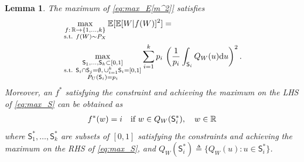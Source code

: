 \documentclass[conference]{IEEEtran}
\newtheorem{lemma}{Lemma}
\newcommand{\R}{\mathbb{R}}
\newcommand{\E}{\mathbb{E}}
\def\sS{{\mathsf S}}
\def\rd{{\rm d}}
\def\deq{\triangleq}
\begin{document}
\begin{lemma}\label{lm:convert_f_S}
The maximum of \eqref{eq:max_E[m^2]} satisfies
\begin{align}
& \max_{\substack{f:\,\R \rightarrow \{1,\ldots,k\} 
\\ 
\textnormal{s.t. } f(W)\sim P_X}} \E[\E[W|f(W)]^2] = 
\nonumber \\
& 
\max_{\substack{\sS_1,\ldots,\sS_k\subset[0,1] 
\\
\textnormal{s.t. } 
\sS_i\cap \sS_j = \emptyset, \, \cup_{i=1}^k \sS_i = [0,1] \\
P_U(\sS_i)=p_i } }
\sum_{i=1}^k p_i \, \left(\frac{1}{p_i}\int_{\sS_i}Q_W(u) \rd u \right)^2 . \label{eq:max_S}
\end{align}
Moreover, an $f^*$ satisfying the constraint and achieving the maximum on the LHS of \eqref{eq:max_S} can be obtained as
\begin{align}
    f^*(w) = i \quad\textnormal{if $w\in Q_W(\sS^*_i)$} , \quad w\in\R \label{eq:f*_def}
\end{align}
where $\sS^*_1,\ldots,\sS^*_k$ are subsets of $[0,1]$ satisfying the constraints and achieving the maximum on the RHS of \eqref{eq:max_S}, and $Q_W(\sS^*_i) \deq \{Q_W(u): u\in \sS^*_i\}$.


\end{lemma}
\end{document}
